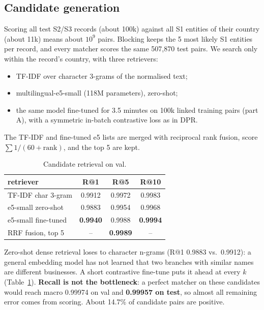 \subsection{Candidate generation}

Scoring all test S2/S3 records (about 100k) against all S1 entities of their country (about 11k) means
about $10^9$ pairs. Blocking keeps the 5 most likely S1 entities per record, and every matcher scores the
same 507,870 test pairs. We search only within the record's country, with three retrievers:
\begin{itemize}
  \item TF-IDF over character 3-grams of the normalised text;
  \item multilingual-e5-small (118M parameters), zero-shot;
  \item the same model fine-tuned for 3.5 minutes on 100k linked training pairs (part A), with a symmetric
        in-batch contrastive loss as in DPR.
\end{itemize}
The TF-IDF and fine-tuned e5 lists are merged with reciprocal rank fusion,
score $\sum 1/(60+\text{rank})$, and the top 5 are kept.

\begin{table}[h]
\centering\small
\begin{tabular}{lccc}
\toprule
retriever & R@1 & R@5 & R@10 \\
\midrule
TF-IDF char 3-gram   & 0.9912 & 0.9972 & 0.9983 \\
e5-small zero-shot   & 0.9883 & 0.9954 & 0.9968 \\
e5-small fine-tuned  & \textbf{0.9940} & 0.9988 & \textbf{0.9994} \\
RRF fusion, top 5    & -- & \textbf{0.9989} & -- \\
\bottomrule
\end{tabular}
\caption{Candidate retrieval on val.}
\label{tab:retrieval}
\end{table}

Zero-shot dense retrieval loses to character n-grams (R@1 0.9883 vs.\ 0.9912): a general embedding model has
not learned that two branches with similar names are different businesses. A short contrastive fine-tune
puts it ahead at every $k$ (Table~\ref{tab:retrieval}). \textbf{Recall is not the bottleneck}: a perfect
matcher on these candidates would reach macro \fhalf{} 0.99974 on val and \textbf{0.99957 on test}, so almost
all remaining error comes from scoring. About 14.7\% of candidate pairs are positive.
